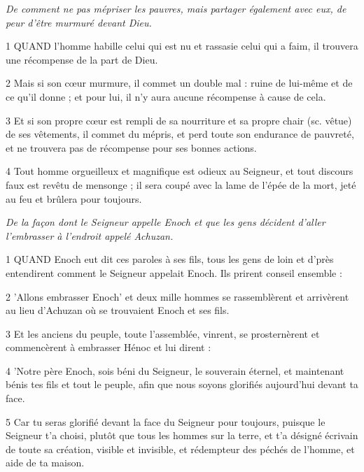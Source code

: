
\par \textit{De comment ne pas mépriser les pauvres, mais partager également avec eux, de peur d'être murmuré devant Dieu.}

\par 1 QUAND l'homme habille celui qui est nu et rassasie celui qui a faim, il trouvera une récompense de la part de Dieu.

\par 2 Mais si son cœur murmure, il commet un double mal : ruine de lui-même et de ce qu'il donne ; et pour lui, il n'y aura aucune récompense à cause de cela.

\par 3 Et si son propre cœur est rempli de sa nourriture et sa propre chair (sc. vêtue) de ses vêtements, il commet du mépris, et perd toute son endurance de pauvreté, et ne trouvera pas de récompense pour ses bonnes actions.

\par 4 Tout homme orgueilleux et magnifique est odieux au Seigneur, et tout discours faux est revêtu de mensonge ; il sera coupé avec la lame de l'épée de la mort, jeté au feu et brûlera pour toujours.


\par \textit{De la façon dont le Seigneur appelle Enoch et que les gens décident d'aller l'embrasser à l'endroit appelé Achuzan.}

\par 1 QUAND Enoch eut dit ces paroles à ses fils, tous les gens de loin et d'près entendirent comment le Seigneur appelait Enoch. Ils prirent conseil ensemble :

\par 2 'Allons embrasser Enoch' et deux mille hommes se rassemblèrent et arrivèrent au lieu d'Achuzan où se trouvaient Enoch et ses fils.

\par 3 Et les anciens du peuple, toute l'assemblée, vinrent, se prosternèrent et commencèrent à embrasser Hénoc et lui dirent :

\par 4 'Notre père Enoch, sois béni du Seigneur, le souverain éternel, et maintenant bénis tes fils et tout le peuple, afin que nous soyons glorifiés aujourd'hui devant ta face.

\par 5 Car tu seras glorifié devant la face du Seigneur pour toujours, puisque le Seigneur t'a choisi, plutôt que tous les hommes sur la terre, et t'a désigné écrivain de toute sa création, visible et invisible, et rédempteur des péchés de l'homme, et aide de ta maison.

